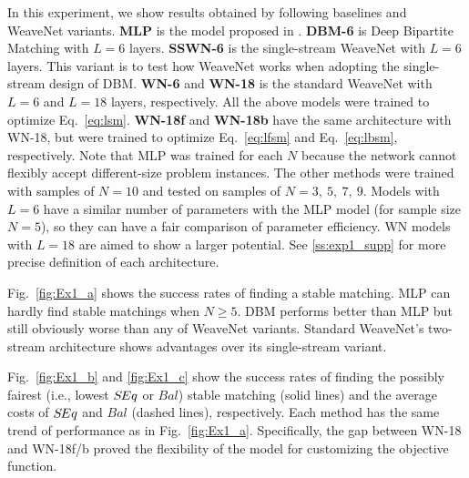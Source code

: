 In this experiment, we show results obtained by following baselines and WeaveNet variants.
{\bf MLP} is the model proposed in \cite{harvard2019}. 
{\bf DBM-6} is Deep Bipartite Matching \cite{gibbons2019deep} with $L=6$ layers.
{\bf SSWN-6} is the single-stream WeaveNet with $L=6$ layers.
This variant is to test how WeaveNet works when adopting the single-stream design of DBM.
{\bf WN-6} and {\bf WN-18} is the standard WeaveNet with $L=6$ and $L=18$ layers, respectively.
All the above models were trained to optimize Eq.~\eqref{eq:lsm}. 
{\bf WN-18f} and {\bf WN-18b} have the same architecture with WN-18, but were trained to optimize Eq.~\eqref{eq:lfsm} and Eq.~\eqref{eq:lbsm}, respectively. 
Note that MLP was trained for each $N$ because the network cannot flexibly accept different-size problem instances. The other methods were trained with samples of $N=10$ and tested on samples of $N=3,~5,~7,~9$.
Models with $L=6$ have a similar number of parameters with the MLP model (for sample size $N=5$), so they can have a fair comparison of parameter efficiency. WN models with $L=18$ are aimed to show a larger potential.
See \ref{ss:exp1_supp} for more precise definition of each architecture.

Fig.~\ref{fig:Ex1_a} shows the success rates of finding a stable matching. MLP can hardly find stable matchings when $N\geq 5$. DBM performs better than MLP but still obviously worse than any of WeaveNet variants. Standard WeaveNet's two-stream architecture shows advantages over its single-stream variant.

Fig.~\ref{fig:Ex1_b} and \ref{fig:Ex1_c} show the success rates of finding the possibly fairest (i.e., lowest $S\hspace{-0.1em}Eq$ or $Bal$) stable matching (solid lines) and the average costs of $S\hspace{-0.1em}Eq$ and $Bal$ (dashed lines), respectively. Each method has the same trend of performance as in Fig.~\ref{fig:Ex1_a}.
Specifically, the gap between WN-18 and WN-18f/b proved the flexibility of the model for customizing the objective function.

